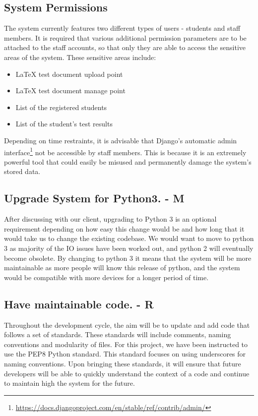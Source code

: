 \documentclass[12pt]{article}
\begin{document}
	\subsection{System Permissions}
	The system currently features two different types of users - students and staff members. It is required that various additional permission parameters are to be attached to the staff accounts, so that only they are able to access the sensitive areas of the system. These sensitive areas include:
	\begin{itemize}  
        \item LaTeX test document upload point
        \item LaTeX test document manage point
        \item List of the registered students
        \item List of the student's test results
    \end{itemize}
    Depending on time restraints, it is advisable that Django's automatic admin interface\footnote{\url{https://docs.djangoproject.com/en/stable/ref/contrib/admin/}} not be accessible by staff members. This is because it is an extremely powerful tool that could easily be misused and permanently damage the system's stored data.

	\subsection{Upgrade System for Python3. - M}
	After discussing with our client, upgrading to Python 3 is an optional requirement depending on how easy this change would be and how long that it would take us to change the existing codebase. 
We would want to move to python 3 as majority of the IO issues have been worked out, and python 2 will eventually become obsolete. By changing to python 3 it means that the system will be more maintainable as more people will know this release of python, and the system would be compatible with more devices for a longer period of time.

	\subsection{Have maintainable code. - R}
	Throughout the development cycle, the aim will be to update and add code that follows a set of standards. These standards will include comments, naming conventions and modularity of files. For this project, we have been instructed to use the PEP8 Python standard. This standard focuses on using underscores for naming conventions. Upon bringing these standards, it will ensure that future developers will be able to quickly understand the context of a code and continue to maintain high the system for the future.
	
\end{document}
